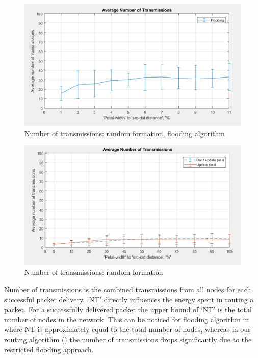 \begin{figure}[hbtp]
\centering
\includegraphics[width=\textwidth,height=\textheight,keepaspectratio]{ncsuthesis-0.6/Chapter-5/figs/fl_trans_random.png}
\caption{Number of transmissions: random formation, flooding algorithm}
\label{fig:fl_trans_random}
\end{figure}

\begin{figure}[hbtp]
\centering
\includegraphics[width=\textwidth,height=\textheight,keepaspectratio]{ncsuthesis-0.6/Chapter-5/figs/pe_tran_random.png}
\caption{Number of transmissions: random formation}
\label{fig:pe_trans_random}
\end{figure}

Number of transmissions is the combined transmissions from all nodes for each successful packet delivery. `NT' directly influences the energy spent in routing a packet. For a successfully delivered packet the upper bound of `NT' is the total number of nodes in the network. This can be noticed for flooding algorithm in  where NT is approximately equal to the total number of nodes, whereas in our routing algorithm () the number of transmissions drops significantly due to the restricted flooding approach.

